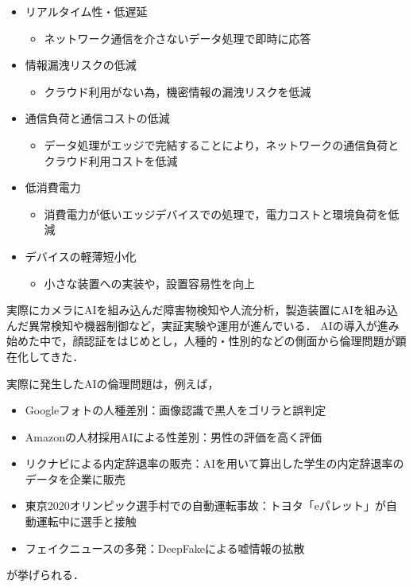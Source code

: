 \begin{itemize}
	\item リアルタイム性・低遅延
	\begin{itemize}
		\item ネットワーク通信を介さないデータ処理で即時に応答
	\end{itemize}
	\item 情報漏洩リスクの低減
	\begin{itemize}
		\item クラウド利用がない為，機密情報の漏洩リスクを低減
	\end{itemize}
	\item 通信負荷と通信コストの低減
	\begin{itemize}
		\item データ処理がエッジで完結することにより，ネットワークの通信負荷とクラウド利用コストを低減
	\end{itemize}
	\item 低消費電力
	\begin{itemize}
		\item 消費電力が低いエッジデバイスでの処理で，電力コストと環境負荷を低減
	\end{itemize}
	\item デバイスの軽薄短小化
	\begin{itemize}
		\item 小さな装置への実装や，設置容易性を向上
	\end{itemize}
\end{itemize}

実際にカメラにAIを組み込んだ障害物検知や人流分析，製造装置にAIを組み込んだ異常検知や機器制御など，実証実験や運用が進んでいる．
AIの導入が進み始めた中で，顔認証をはじめとし，人種的・性別的などの側面から倫理問題が顕在化してきた．

実際に発生したAIの倫理問題は，例えば，
\begin{itemize}
	\item Googleフォトの人種差別：画像認識で黒人をゴリラと誤判定
	\item Amazonの人材採用AIによる性差別：男性の評価を高く評価
	\item リクナビによる内定辞退率の販売：AIを用いて算出した学生の内定辞退率のデータを企業に販売
	\item 東京2020オリンピック選手村での自動運転事故：トヨタ「eパレット」が自動運転中に選手と接触
	\item フェイクニュースの多発：DeepFakeによる嘘情報の拡散
\end{itemize}
が挙げられる．

